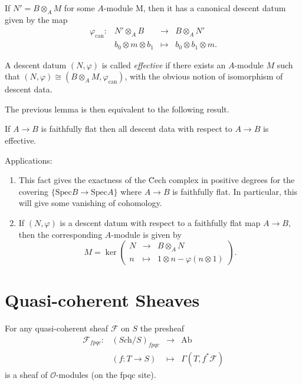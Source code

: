 \noindent
If $N' = B \otimes_A M$ for some $A$-module M, then it has a canonical descent 
datum given by the map
$$
\begin{matrix}
 \varphi_\text{can}: & N' \otimes_A B & \to & B \otimes_A N' \\
& b_0 \otimes m \otimes b_1 & \mapsto & b_0 \otimes b_1 \otimes m.
\end{matrix}
$$

\begin{definition}
\label{definition-effective-modules}
A descent datum $(N,\varphi)$ is called {\it effective} if there exists an 
$A$-module $M$ such that $(N,\varphi) \cong (B\otimes_A M, 
\varphi_\text{can})$, with the obvious notion of isomorphism of descent data.
\end{definition}

\noindent
The previous lemma is then equivalent to the following result.

\begin{theorem}
\label{theorem-descent-modules}
If $A \to B$ is faithfully flat then all descent data with respect to $A\to B$ 
is effective. 
\end{theorem}

\begin{remarks}
\label{remarks-theorem-modules-exactness}
Applications:
\begin{enumerate}
\item
This fact gives the exactness of the \u Cech complex in positive degrees for 
the covering $\{ \text{Spec} B \to \text{Spec} A\}$ where $A \to B$ is 
faithfully flat. In particular, this will give some vanishing of cohomology.
\item
If $(N,\varphi)$ is a descent datum with respect to a faithfully flat map
$A \to B$, then the corresponding $A$-module is given by 
$$
M = \ker \left(
\begin{matrix}
N & \longrightarrow & B\otimes_A N \\
n & \longmapsto & 1 \otimes n - \varphi(n\otimes 1)
\end{matrix}
\right).
$$ 
\end{enumerate}
\end{remarks}




\section{Quasi-coherent Sheaves}
\label{section-quasi-coherent}

\begin{proposition}
\label{proposition-quasi-coherent-sheaf-fpqc}
For any quasi-coherent sheaf $\mathcal{F}$ on $S$ the presheaf
$$
\begin{matrix}
\mathcal{F}_{fpqc} : & (\textit{Sch}/S)_{fpqc} & \to & \text{Ab}\\ 
& (f: T \to S) &\mapsto & \Gamma(T, f^*\mathcal{F})
\end{matrix}
$$
  is a sheaf of $\mathcal{O}$-modules (on the fpqc site). 
\end{proposition}


